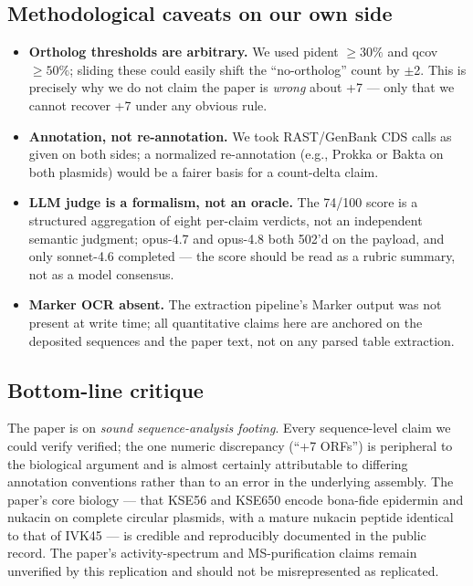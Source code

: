 \documentclass[11pt,letterpaper]{article}
\begin{document}
\subsection{Methodological caveats on our own side}

\begin{itemize}
  \item \textbf{Ortholog thresholds are arbitrary.} We used pident $\geq 30\%$ and qcov $\geq 50\%$; sliding these could easily shift the ``no-ortholog'' count by $\pm$2. This is precisely why we do not claim the paper is \textit{wrong} about +7 --- only that we cannot recover +7 under any obvious rule.
  \item \textbf{Annotation, not re-annotation.} We took RAST/GenBank CDS calls as given on both sides; a normalized re-annotation (e.g., Prokka or Bakta on both plasmids) would be a fairer basis for a count-delta claim.
  \item \textbf{LLM judge is a formalism, not an oracle.} The 74/100 score is a structured aggregation of eight per-claim verdicts, not an independent semantic judgment; opus-4.7 and opus-4.8 both 502'd on the payload, and only sonnet-4.6 completed --- the score should be read as a rubric summary, not as a model consensus.
  \item \textbf{Marker OCR absent.} The extraction pipeline's Marker output was not present at write time; all quantitative claims here are anchored on the deposited sequences and the paper text, not on any parsed table extraction.
\end{itemize}

\subsection{Bottom-line critique}

The paper is on \emph{sound sequence-analysis footing}. Every sequence-level claim we could verify verified; the one numeric discrepancy (``+7 ORFs'') is peripheral to the biological argument and is almost certainly attributable to differing annotation conventions rather than to an error in the underlying assembly. The paper's core biology --- that KSE56 and KSE650 encode bona-fide epidermin and nukacin on complete circular plasmids, with a mature nukacin peptide identical to that of IVK45 --- is credible and reproducibly documented in the public record. The paper's activity-spectrum and MS-purification claims remain unverified by this replication and should not be misrepresented as replicated.
\end{document}

